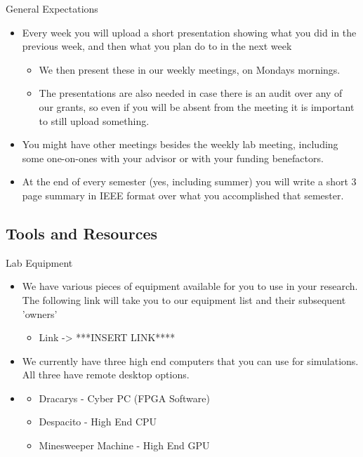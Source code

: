 \documentclass[handout]{beamer}
\begin{document}
\begin{frame}{General Expectations}
\begin{itemize}
  \item Every week you will upload a short presentation showing what you did in the previous week, and then what you plan do to in the next week 
  \begin{itemize}
      \item We then present these in our weekly meetings, on Mondays mornings. 
      \item The presentations are also needed in case there is an audit over any of our grants, so even if you will be absent from the meeting it is important to still upload something.
  \end{itemize}
  \item You might have other meetings besides the weekly lab meeting, including some one-on-ones with your advisor or with your funding benefactors.
  \item At the end of every semester (yes, including summer) you will write a short 3 page summary in IEEE format over what you accomplished that semester. 
\end{itemize}
\end{frame}

\subsection{Tools and Resources}

\begin{frame}{Lab Equipment}
\begin{itemize}
  \item We have various pieces of equipment available for you to use in your research. The following link will take you to our equipment list and their subsequent 'owners'
  \begin{itemize}
      \item Link -> ***INSERT LINK****
  \end{itemize}
  \item We currently have three high end computers that you can use for simulations. All three have remote desktop options.
  \item \begin{itemize}
      \item Dracarys - Cyber PC (FPGA Software)
      \item Despacito - High End CPU
      \item Minesweeper Machine - High End GPU 
  \end{itemize}
\end{itemize}
\end{frame}
\end{document}
